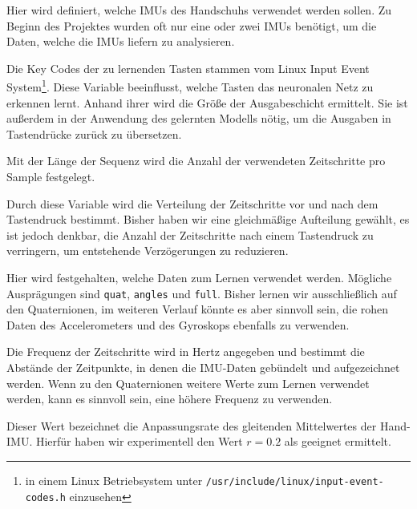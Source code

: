\begin{description}[font=\texttt]
    \item[imu\_ids]
        Hier wird definiert, welche IMUs des Handschuhs verwendet werden sollen. Zu Beginn des Projektes wurden oft nur eine oder zwei IMUs benötigt, um die Daten, welche die IMUs liefern zu analysieren.

    \item[key\_codes]
        Die Key Codes der zu lernenden Tasten stammen vom  Linux Input Event System\footnote{in einem Linux Betriebsystem unter \texttt{/usr/include/linux/input-event-codes.h} einzusehen}. Diese Variable beeinflusst, welche Tasten das neuronalen Netz zu erkennen lernt. Anhand ihrer wird die Größe der Ausgabeschicht ermittelt. Sie ist außerdem in der Anwendung des gelernten Modells nötig, um die Ausgaben in Tastendrücke zurück zu übersetzen.

    \item[sequence\_length]
        Mit der Länge der Sequenz wird die Anzahl der verwendeten Zeitschritte pro Sample festgelegt.

    \item[sequence\_ratio]
        Durch diese Variable wird die Verteilung der Zeitschritte vor und nach dem Tastendruck bestimmt. Bisher haben wir eine gleichmäßige Aufteilung gewählt, es ist jedoch denkbar, die Anzahl der Zeitschritte nach einem Tastendruck zu verringern, um entstehende Verzögerungen zu reduzieren.

    \item[sampling\_mode]
        Hier wird festgehalten, welche Daten zum Lernen verwendet werden. Mögliche Ausprägungen sind \texttt{quat}, \texttt{angles} und \texttt{full}. Bisher lernen wir ausschließlich auf den Quaternionen, im weiteren Verlauf könnte es aber sinnvoll sein, die rohen Daten des Accelerometers und des Gyroskops ebenfalls zu verwenden.

    \item[sampling\_rate]
        Die Frequenz der Zeitschritte wird in Hertz angegeben und bestimmt die Abstände der Zeitpunkte, in denen die IMU-Daten gebündelt und aufgezeichnet werden.
        Wenn zu den Quaternionen weitere Werte zum Lernen verwendet werden, kann es sinnvoll sein, eine höhere Frequenz zu verwenden.

    \item[base\_imu\_relative\_average\_rate]
        Dieser Wert bezeichnet die Anpassungsrate des gleitenden Mittelwertes der Hand-IMU. Hierfür haben wir experimentell den Wert $r = 0.2$ als geeignet ermittelt.


\end{description}
